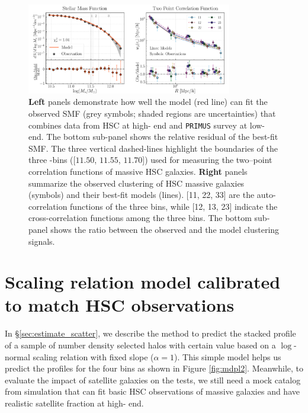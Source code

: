 \documentclass[fleqn,usenatbib,useAMS,english]{mnras}
\begin{document}
\begin{figure}
  \centering
  \includegraphics[width=0.8\textwidth]{figure/topn_fig_3}
  \caption{
      \textbf{Left} panels demonstrate how well the model (red line) can fit the observed SMF
      (grey symbols; shaded regions are uncertainties) that combines data from HSC at high-\mstar{}
      end and \texttt{PRIMUS} survey at low-\mstar{} end.
      The bottom sub-panel shows the relative residual of the best-fit SMF.
      The three vertical dashed-lines highlight the \mstar{} boundaries of the three \mstar{}-bins
      ([$11.50$, $11.55$, $11.70$]) used for measuring the two--point correlation functions of massive
      HSC galaxies.
      \textbf{Right} panels summarize the observed clustering of HSC massive galaxies (symbols)
      and their best-fit models (lines).
      [11, 22, 33] are the auto-correlation functions of the three \mstar{} bins, while
      [12, 13, 23] indicate the cross-correlation functions among the three bins.
      The bottom sub-panel shows the ratio between the observed and the model clustering signals.
    }
  \label{fig:best_mock}
\end{figure}

\section{Scaling relation model calibrated to match HSC observations}
    \label{app:hsc_model}

    In \S \ref{sec:estimate_scatter}, we describe the method to predict the stacked \dsigma{}
    profile of a sample of number density selected halos with certain \scatterMhaloObsSym{} value
    based on a $\log$-normal scaling relation with fixed slope ($\alpha=1$).
    This simple model helps us predict the \dsigma{} profiles for the four \topn{} bins
    as shown in Figure \ref{fig:mdpl2}.
    Meanwhile, to evaluate the impact of satellite galaxies on the \topn{} tests, we still need
    a mock catalog from simulation that can fit basic HSC observations of massive galaxies and
    have realistic satellite fraction at high-\mstar{} end.
\end{document}
